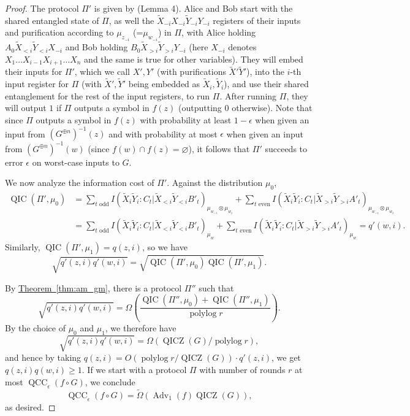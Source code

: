 \documentclass[10pt,a4paper]{article}
\theoremstyle{definition}
\newcommand{\thm}[1]{\hyperref[thm:#1]{Theorem~\ref*{thm:#1}}}
\DeclareMathOperator{\polylog}{polylog}
\newcommand{\tOmega}{\tilde{\Omega}}
\renewcommand{\>}{\rangle}
\newcommand{\<}{\langle}
\newcommand{\tX}{\widetilde{X}}
\newcommand{\tY}{\widetilde{Y}}
\DeclareMathOperator{\Adv}{Adv}
\DeclareMathOperator{\QCC}{QCC}
\DeclareMathOperator{\QICZ}{QICZ}
\DeclareMathOperator{\QIC}{QIC}
\begin{document}
\begin{proof}
The protocol $\Pi'$ is given by \cite{Tou15} (Lemma 4). Alice and Bob start with the shared entangled state of $\Pi$, as well the $\tX_{-i}X_{-i}\tY_{-i}Y_{-i}$ registers of their inputs and purification according to $\mu_{z_{-i}}$ (=$\mu_{w_{-i}}$) in $\Pi$, with Alice holding $A_0\tX_{<i}\tY_{<i}X_{-i}$ and Bob holding $B_0\tX_{>i}\tY_{>i}Y_{-i}$ (here $X_{-i}$ denotes $X_1\ldots X_{i-1}X_{i+1}\ldots X_n$ and the same is true for other variables). They will embed their inputs for $\Pi'$, which we call $X',Y'$ (with purifications $\tX'\tY'$), into the $i$-th input register for $\Pi$ (with $\tX', \tY'$ being embedded as $\tX_i, \tY_i$), and use their shared entanglement for the rest of the input registers, to run $\Pi$. After running $\Pi$, they will output $1$ if
$\Pi$ outputs a symbol in $f(z)$ (outputting $0$ otherwise).
Note that since $\Pi$ outputs a symbol in $f(z)$
with probability at least $1-\epsilon$ when given an input
from $(G^{\oplus n})^{-1}(z)$ and with probability at most $\epsilon$
when given an input from $(G^{\oplus n})^{-1}(w)$
(since $f(w)\cap f(z)=\varnothing$), it follows that
$\Pi'$ succeeds to error $\epsilon$ on worst-case inputs
to $G$.

We now analyze the information cost of $\Pi'$. Against the distribution $\mu_0$,
\begin{align*}
\QIC(\Pi', \mu_0) & = \sum_{t \text{ odd}}I(\tX_i\tY_i:C_t|\tX_{<i}\tY_{<i}B'_t)_{\mu_{w_{-i}}\otimes \mu_{w_i}} + \sum_{t\text{ even}}I(\tX_i\tY_i:C_t|\tX_{>i}\tY_{>i}A'_t)_{\mu_{w_{-i}}\otimes\mu_{w_i}} \\
 & = \sum_{t \text{ odd}}I(\tX_i\tY_i:C_t|\tX_{<i}\tY_{<i}B'_t)_{\mu_w} + \sum_{t\text{ even}}I(\tX_i\tY_i:C_t|\tX_{>i}\tY_{>i}A'_t)_{\mu_w} = q'(w,i).
\end{align*}
Similarly, $\QIC(\Pi',\mu_1)=q(z,i)$,
so we have
\[\sqrt{q'(z,i)q'(w,i)}
=\sqrt{\QIC(\Pi',\mu_0)\QIC(\Pi',\mu_1)}.\]

By \thm{am_gm}, there is a protocol $\Pi''$ such that
\[\sqrt{q'(z,i)q'(w,i)}= \Omega\left(\frac{\QIC(\Pi'',\mu_0)+\QIC(\Pi'',\mu_1)}
{\polylog r}\right).\]
By the choice of $\mu_0$ and $\mu_1$, we therefore have
\[\sqrt{q'(z,i)q'(w,i)}=\Omega(\QICZ(G)/\polylog r),\]
and hence by taking $q(z,i)=O(\polylog r/\QICZ(G))\cdot q'(z,i)$,
we get $q(z,i)q(w,i)\ge 1$. If we start with a protocol $\Pi$
with number of rounds $r$ at most $\QCC_{\epsilon}(f\circ G)$,
we conclude
\[\QCC_\epsilon(f\circ G)=\tOmega(\Adv_1(f)\QICZ(G)),\]
as desired.
\end{proof}
\end{document}
